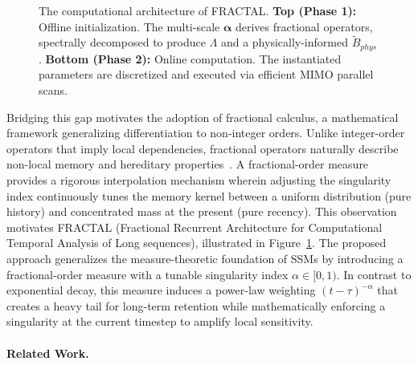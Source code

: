 \documentclass{article}
\theoremstyle{plain}
\theoremstyle{definition}
\theoremstyle{remark}
\begin{document}
\begin{figure}[t]
	\caption{The computational architecture of FRACTAL. \textbf{Top (Phase 1):} Offline initialization. The multi-scale $\boldsymbol{\alpha}$ derives fractional operators, spectrally decomposed to produce $\Lambda$ and a physically-informed $\tilde{B}_{phys}$. \textbf{Bottom (Phase 2):} Online computation. The instantiated parameters are discretized and executed via efficient MIMO parallel scans.}
	\label{fig:fractal_arch}
\end{figure}

Bridging this gap motivates the adoption of fractional calculus, a mathematical framework generalizing differentiation to non-integer orders. Unlike integer-order operators that imply local dependencies, fractional operators naturally describe non-local memory and hereditary properties~\citep{podlubny1998fractional}. A fractional-order measure provides a rigorous interpolation mechanism wherein adjusting the singularity index continuously tunes the memory kernel between a uniform distribution (pure history) and concentrated mass at the present (pure recency). This observation motivates FRACTAL (Fractional Recurrent Architecture for Computational Temporal Analysis of Long sequences), illustrated in Figure~\ref{fig:fractal_arch}. The proposed approach generalizes the measure-theoretic foundation of SSMs by introducing a fractional-order measure with a tunable singularity index $\alpha \in [0, 1)$. In contrast to exponential decay, this measure induces a power-law weighting $(t-\tau)^{-\alpha}$ that creates a heavy tail for long-term retention while mathematically enforcing a singularity at the current timestep to amplify local sensitivity.

\paragraph{Related Work.}
\label{sec:related_work}
\end{document}
